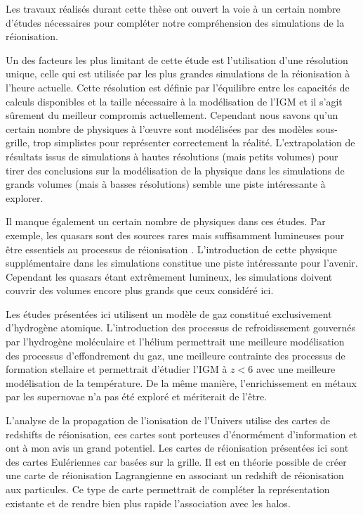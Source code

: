 Les travaux réalisés durant cette thèse ont ouvert la voie à un certain nombre d'études nécessaires pour compléter notre compréhension des simulations de la réionisation.

Un des facteurs les plus limitant de cette étude est l'utilisation d'une résolution unique, celle qui est utilisée par les plus grandes simulations de la réionisation à l'heure actuelle. 
Cette résolution est définie par l’équilibre entre les capacités de calculs disponibles et la taille nécessaire à la modélisation de l'\ac{IGM} et il s'agit sûrement du meilleur compromis actuellement.
Cependant nous savons qu'un certain nombre de physiques à l’œuvre sont modélisées par des modèles sous-grille, trop simplistes pour représenter correctement la réalité.
L'extrapolation de résultats issus de simulations à hautes résolutions (mais petits volumes) pour tirer des conclusions sur la modélisation de la physique dans les simulations de grands volumes (mais à basses résolutions) semble une piste intéressante à explorer.

Il manque également un certain nombre de physiques dans ces études.
Par exemple, les quasars sont des sources rares mais suffisamment lumineuses pour être essentiels au processus de réionisation \citep{chardin_large-scale_2017}.
L'introduction de cette physique supplémentaire dans les simulations constitue une piste intéressante pour l'avenir.
Cependant les quasars étant extrêmement lumineux, les simulations doivent couvrir des volumes encore plus grands que ceux considéré ici.

Les études présentées ici utilisent un modèle de gaz constitué exclusivement d'hydrogène atomique.
L'introduction des processus de refroidissement gouvernés par l'hydrogène moléculaire et l'hélium permettrait une meilleure modélisation des processus d’effondrement du gaz, une meilleure contrainte des processus de formation stellaire et permettrait d'étudier l'\ac{IGM} à $z<6$ avec une meilleure modélisation de la température.
De la même manière, l'enrichissement en métaux par les supernovae n'a pas été exploré et mériterait de l'être.

L'analyse de la propagation de l'ionisation de l'Univers utilise des cartes de redshifts de réionisation, ces cartes sont porteuses d'énormément d'information et ont à mon avis un grand potentiel.
Les cartes de réionisation présentées ici sont des cartes Eulériennes car basées sur la grille.
Il est en théorie possible de créer une carte de réionisation Lagrangienne en associant un redshift de réionisation aux particules.
Ce type de carte permettrait de compléter la représentation existante et de rendre bien plus rapide l'association avec les halos.

